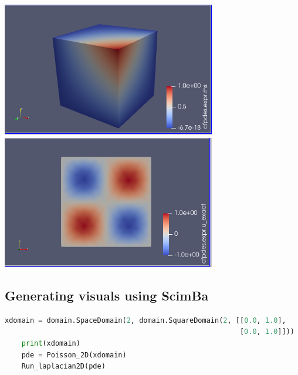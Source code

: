 \documentclass[12pt]{article}
\begin{document}
\begin{enumerate}
\begin{frame}{}
    \begin{center}
        \includegraphics[width=0.7\textwidth]{images/paraview 3d.png}
        \includegraphics[width=0.7\textwidth]{images/laplacian2d2d.png}
    \end{center}
\end{frame}

\newpage

\subsection{Generating visuals using ScimBa}
\begin{lstlisting}[language=Python,caption={},frame=single, backgroundcolor=\color{gray!10}, basicstyle=\footnotesize,rulecolor=\color{blue}, framexleftmargin=3pt, commentstyle=\color{mygreen}, keywordstyle=\color{blue}]
    xdomain = domain.SpaceDomain(2, domain.SquareDomain(2, [[0.0, 1.0], 
                                                        [0.0, 1.0]]))
    print(xdomain)
    pde = Poisson_2D(xdomain)
    Run_laplacian2D(pde)
    
\end{lstlisting}
    

\end{enumerate}
\end{document}

